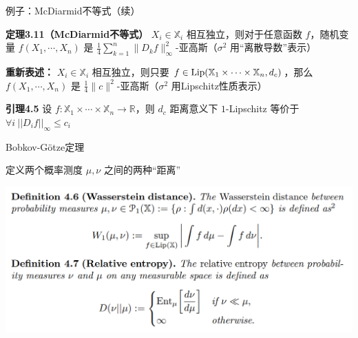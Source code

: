 \documentclass{beamer}
\begin{document}
\begin{frame}{例子：McDiarmid不等式（续）}

\textbf{定理3.11（McDiarmid不等式）} $X_i\in\mathbb{X}_i$ 相互独立，则对于任意函数 $f$，随机变量 $f(X_1, \cdots, X_n)$ 是 $\frac{1}{4} \sum_{k=1}^{n} \|D_k f\|_{\infty}^2$-亚高斯（$\sigma^2$ 用“离散导数”表示）

\quad

\textbf{重新表述：} $X_i\in\mathbb{X}_i$ 相互独立，则只要 $f\in{\rm Lip}(\mathbb{X}_1\times\cdots\times\mathbb{X}_n, d_c)$，那么$f(X_1, \cdots, X_n)$ 是 $\frac{1}{4}\|c\|^2$-亚高斯（$\sigma^2$ 用Lipschitz性质表示）

\quad

\textbf{引理4.5} 设 $f: \mathbb{X}_1\times\cdots\times\mathbb{X}_n \to \mathbb{R}$，则 $d_c$ 距离意义下 $1$-Lipschitz 等价于 $\forall i\ ||D_i f||_{\infty} \le c_i$

\end{frame}

\begin{frame}{Bobkov-G{\"o}tze定理}

定义两个概率测度 $\mu, \nu$ 之间的两种“距离”

\begin{center}
\includegraphics[width=1.0\textwidth, frame]{figures/4-6-def-4-7-def.png}
\end{center}

\end{frame}
\end{document}
